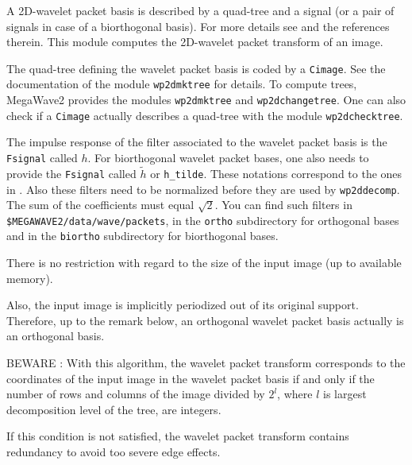 A 2D-wavelet packet basis is described by a quad-tree and a signal (or a pair
of signals in case of a biorthogonal basis). 
For more details see \cite{mallat:wavelet} and the references
therein. 
This module computes the 2D-wavelet packet transform of an image.

The quad-tree defining the wavelet packet basis is coded by a \verb+Cimage+. 
See the documentation of the module \verb+wp2dmktree+ for
details. To compute trees, MegaWave2 provides the modules 
\verb+wp2dmktree+ and \verb+wp2dchangetree+.
One can also check if a \verb+Cimage+ actually
describes a quad-tree with the module \verb+wp2dchecktree+.

The impulse response of the filter associated to the wavelet packet
basis is the \verb+Fsignal+ called $h$. For biorthogonal wavelet
packet bases, one also needs to provide the \verb+Fsignal+ called 
$\tilde{h}$ or \verb+h_tilde+. These notations correspond to the ones in
\cite{mallat:wavelet}.  Also these filters need to be normalized before
they are used by \verb+wp2ddecomp+. The sum of the coefficients must equal
$\sqrt{2}$. You can find such filters in \verb+$MEGAWAVE2/data/wave/packets+,
in the \verb+ortho+ subdirectory for orthogonal bases and in the
\verb+biortho+ subdirectory for biorthogonal bases.
 
There is no restriction with regard to the size of the input
image (up to available memory).

Also, the input image is implicitly periodized out of its original
support. Therefore, up to the remark below, an orthogonal wavelet
packet basis actually is an orthogonal basis. 

BEWARE : With this algorithm, the wavelet packet transform corresponds
to the coordinates of the input image in the wavelet packet basis if
and only if the number of rows and columns of the image divided by
$2^l$, where $l$ is largest decomposition level of the tree, are
integers.

If this condition is not satisfied, the wavelet packet transform
contains redundancy to avoid too severe edge effects.

